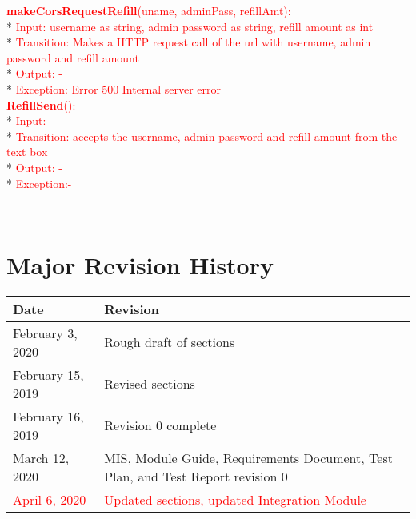 \documentclass[12,english]{article}
\begin{document}
			\textcolor{red}{\textbf{makeCorsRequestRefill}(uname, adminPass, refillAmt):} \\*
			\textcolor{red}{Input: username as string, admin password as string, refill amount as int} \\*
			\textcolor{red}{Transition: Makes a HTTP request call of the url with username, admin password and refill amount} \\*
			\textcolor{red}{ Output: - } \\*
			\textcolor{red}{Exception: Error 500 Internal server error } 
			\\
			
			\textcolor{red}{\textbf{RefillSend}():} \\*
			\textcolor{red}{Input: -} \\*
			\textcolor{red}{Transition: accepts the username, admin password and refill amount from the text box} \\*
			\textcolor{red}{ Output: - } \\*
			\textcolor{red}{Exception:-  } 
			
			\\
			
			
			
			
	\newpage	
	\section{Major Revision History}
\begin{table}[!htbp]
	\begin{tabular}{|l|l|}
		\toprule
		Date & Revision\\ \hline
		February 3, 2020 & Rough draft of sections\\ \hline
		February 15, 2019 & Revised sections \\ \hline
		February 16, 2019 & Revision 0 complete\\ \hline
		March 12, 2020 & MIS, Module Guide, Requirements Document, Test Plan, and Test Report revision 0 \\ \hline
		\textcolor{red}{April 6, 2020} & \textcolor{red}{Updated sections, updated Integration Module} \\ \hline
		
	\end{tabular}
\end{table}
			


			
\end{document}
